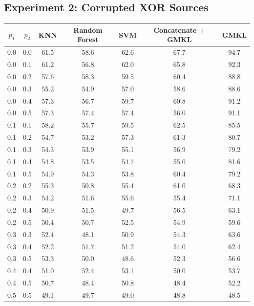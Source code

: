 \documentclass{article}
\begin{document}
\subsection*{Experiment 2: Corrupted XOR Sources}

\begin{minipage}{\textwidth}
\centering
\begin{tabular}{|c| c| c| c| c| c| c|}
\hline
$p_1$ & $p_2$ & KNN & Random Forest & SVM & Concatenate + GMKL & GMKL \\
\hline
0.0 & 0.0 & 61.5 & 58.6 & 62.6 & 67.7 & 94.7 \\
\hline
0.0 & 0.1 & 61.2 & 56.8 & 62.0 & 65.8 & 92.3 \\
\hline
0.0 & 0.2 & 57.6 & 58.3 & 59.5 & 60.4 & 88.8 \\
\hline
0.0 & 0.3 & 55.2 & 54.9 & 57.0 & 58.6 & 88.6 \\
\hline
0.0 & 0.4 & 57.3 & 56.7 & 59.7 & 60.8 & 91.2 \\
\hline
0.0 & 0.5 & 57.3 & 57.4 & 57.4 & 56.0 & 91.1 \\
\hline
0.1 & 0.1 & 58.2 & 55.7 & 59.5 & 62.5 & 85.5 \\
\hline
0.1 & 0.2 & 54.7 & 53.2 & 57.3 & 61.3 & 80.7 \\
\hline
0.1 & 0.3 & 54.3 & 53.9 & 55.1 & 56.9 & 79.2 \\
\hline
0.1 & 0.4 & 54.8 & 53.5 & 54.7 & 55.0 & 81.6 \\
\hline
0.1 & 0.5 & 54.9 & 54.3 & 53.8 & 60.4 & 79.2 \\
\hline
0.2 & 0.2 & 55.3 & 50.8 & 55.4 & 61.0 & 68.3 \\
\hline
0.2 & 0.3 & 54.2 & 51.6 & 55.6 & 55.4 & 71.1 \\
\hline
0.2 & 0.4 & 50.9 & 51.5 & 49.7 & 56.5 & 63.1 \\
\hline
0.2 & 0.5 & 50.4 & 50.7 & 52.5 & 54.9 & 59.6 \\
\hline
0.3 & 0.3 & 52.4 & 48.1 & 50.9 & 54.3 & 63.6 \\
\hline
0.3 & 0.4 & 52.2 & 51.7 & 51.2 & 54.0 & 62.4 \\
\hline
0.3 & 0.5 & 53.3 & 50.0 & 48.6 & 52.3 & 56.6 \\
\hline
0.4 & 0.4 & 51.0 & 52.4 & 53.1 & 50.0 & 53.7 \\
\hline
0.4 & 0.5 & 50.7 & 48.4 & 50.8 & 48.4 & 52.2 \\
\hline
0.5 & 0.5 & 49.1 & 49.7 & 49.0 & 48.8 & 48.5 \\
\hline
\end{tabular}
\end{minipage}
\end{document}
